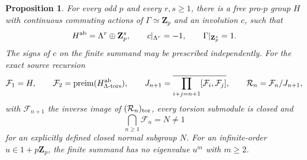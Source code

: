 \documentclass[11pt]{article}
\newtheorem{proposition}[theorem]{Proposition}
\theoremstyle{definition}\newtheorem{definition}[theorem]{Definition}
\begin{document}
\begin{proposition}\label{prop:source-limit-countermodel}
For every odd $p$ and every $r,s\geq1$, there is a
free pro-$p$ group $H$ with continuous commuting
actions of $\Gamma\simeq\mathbf Z_p$ and an involution
$c$, such that
\[
 H^{\rm ab}=\Lambda^r\oplus\mathbf Z_p^s,
 \qquad c|_{\Lambda^r}=-1,
 \qquad\Gamma|_{\mathbf Z_p^s}=1.
\]
The signs of $c$ on the finite summand may be prescribed
independently. For the exact source recursion
\[
 \mathcal F_1=H,\qquad \mathcal F_2=\operatorname{preim}(H^{\rm ab}_{\Lambda\text{-tors}}),
 \qquad J_{n+1}=
 \overline{\prod_{i+j=n+1}[\mathcal F_i,\mathcal F_j]},
 \qquad \mathcal R_n=\mathcal F_n/J_{n+1},
\]
with $\mathcal F_{n+1}$ the inverse image of $(\mathcal R_n)_{\rm tor}$,
every torsion submodule is closed and
\[
                          \bigcap_{n\geq1}\mathcal F_n=N\ne1
\]
for an explicitly defined closed normal subgroup $N$.
For an infinite-order $u\in1+p\mathbf Z_p$, the finite
summand has no eigenvalue $u^m$ with $m\geq2$.
\end{proposition}
\end{document}
